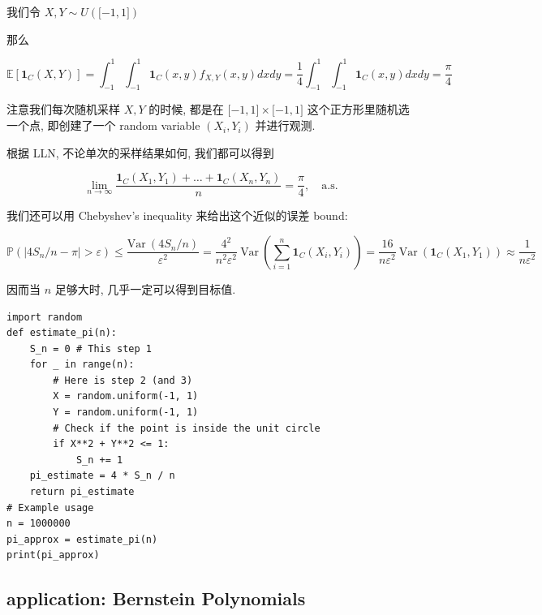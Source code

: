 \documentclass{qlnotes-export}
\begin{document}
\begin{example}[估算 \(\pi\)]\label{ex-04-lln-pi}

我们令 \(X,Y \sim U(\lbrack - 1,1\rbrack)\)

那么

\[{\mathbb{E}}\left\lbrack {\mathbf{1}_{C}(X,Y)} \right\rbrack = \int_{- 1}^{1}\int_{- 1}^{1}\mathbf{1}_{C}(x,y)f_{X,Y}(x,y)dxdy = \frac{1}{4}\int_{- 1}^{1}\int_{- 1}^{1}\mathbf{1}_{C}(x,y)dxdy = \frac{\pi}{4}\]

注意我们每次随机采样 \(X,Y\) 的时候, 都是在 \(\lbrack - 1,1\rbrack \times \lbrack - 1,1\rbrack\) 这个正方形里随机选一个点, 即创建了一个 random variable \((X_{i},Y_{i})\) 并进行观测.

根据 LLN, 不论单次的采样结果如何, 我们都可以得到

\[\lim\limits_{n\rightarrow\infty}\frac{\mathbf{1}_{C}\left( {X_{1},Y_{1}} \right) + \ldots + \mathbf{1}_{C}\left( {X_{n},Y_{n}} \right)}{n} = \frac{\pi}{4},\quad\text{a.s.}\]

我们还可以用 Chebyshev's inequality 来给出这个近似的误差 bound:

\[{\mathbb{P}}\left( {\left| {4S_{n}/n - \pi} \right| > \varepsilon} \right) \leq \frac{\text{Var}\ \left( {4S_{n}/n} \right)}{\varepsilon^{2}} = \frac{4^{2}}{n^{2}\varepsilon^{2}}\ \text{Var}\ \left( {\sum\limits_{i = 1}^{n}\mathbf{1}_{C}\left( {X_{i},Y_{i}} \right)} \right) = \frac{16}{n\varepsilon^{2}}\ \text{Var}\ \left( {\mathbf{1}_{C}\left( {X_{1},Y_{1}} \right)} \right) \approx \frac{1}{n\varepsilon^{2}}\]

因而当 \(n\) 足够大时, 几乎一定可以得到目标值.

\begin{verbatim}
import random
def estimate_pi(n):
    S_n = 0 # This step 1
    for _ in range(n):
        # Here is step 2 (and 3)
        X = random.uniform(-1, 1)
        Y = random.uniform(-1, 1)
        # Check if the point is inside the unit circle
        if X**2 + Y**2 <= 1:
            S_n += 1
    pi_estimate = 4 * S_n / n
    return pi_estimate
# Example usage
n = 1000000
pi_approx = estimate_pi(n)
print(pi_approx)
\end{verbatim}

\end{example}

\subsection{application: Bernstein Polynomials}\label{application-bernstein-polynomials}
\end{document}
